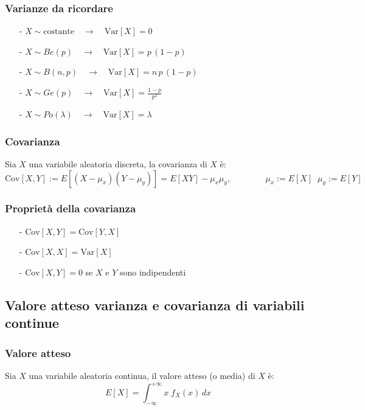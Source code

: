 \documentclass[a4paper]{article}
\newcommand\var{\text{Var}}   %
\newcommand\cov{\text{Cov}}   %
\begin{document}
\subsubsection*{Varianze da ricordare}
\begin{itemize}[topsep=3pt, itemsep=0pt]
	\item[-] \(X \sim \text{costante} \quad \rightarrow \quad \var[X] = 0\)
	\item[-] \(X \sim Be(p) \quad \rightarrow \quad \var[X] = p \, (1-p)\)
	\item[-] \(X \sim B(n,p) \quad \rightarrow \quad \var[X] = n \, p \, (1-p)\)
	\item[-] \(X \sim Ge(p) \quad \rightarrow \quad \var[X] = \displaystyle \frac{1-p}{p^2}\)
	\item[-] \(X \sim Po(\lambda) \quad \rightarrow \quad \var[X] = \lambda\)
\end{itemize}

\subsubsection*{Covarianza}
Sia \(X\) una variabile aleatoria discreta, la covarianza di \(X\) è:
\[\cov[X,Y] := E[(X-\mu_x)(Y-\mu_y)] = E[XY] - \mu_x \mu_y, \qquad \qquad \mu_x := E[X] \;\; \mu_y := E[Y]\]

\subsubsection*{Proprietà della covarianza}
\begin{itemize}[topsep=3pt, itemsep=0pt]
	\item[-] \(\cov[X,Y] = \cov[Y,X]\)
	\item[-] \(\cov[X,X] = \var[X]\)
	\item[-] \(\cov[X,Y] = 0\) se \(X\) e \(Y\) sono indipendenti
\end{itemize}

\subsection{Valore atteso varianza e covarianza di variabili continue}
\subsubsection*{Valore atteso}
Sia \(X\) una variabile aleatoria continua, il valore atteso (o media) di \(X\) è:
\[E[X] = \int_{-\infty}^{+\infty} x \; f_X(x) \, dx\]
\end{document}
